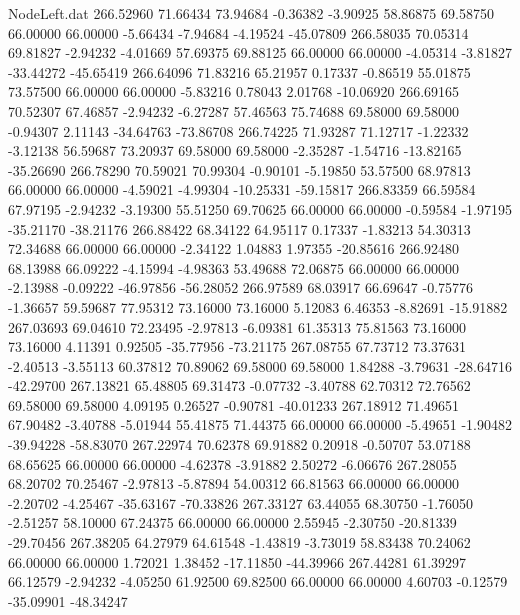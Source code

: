 \begin{filecontents}{NodeLeft.dat}
 266.52960   71.66434   73.94684    -0.36382   -3.90925   58.86875   69.58750   66.00000   66.00000   -5.66434   -7.94684   -4.19524  -45.07809
 266.58035   70.05314   69.81827    -2.94232   -4.01669   57.69375   69.88125   66.00000   66.00000   -4.05314   -3.81827  -33.44272  -45.65419
 266.64096   71.83216   65.21957     0.17337   -0.86519   55.01875   73.57500   66.00000   66.00000   -5.83216    0.78043    2.01768  -10.06920
 266.69165   70.52307   67.46857    -2.94232   -6.27287   57.46563   75.74688   69.58000   69.58000   -0.94307    2.11143  -34.64763  -73.86708
 266.74225   71.93287   71.12717    -1.22332   -3.12138   56.59687   73.20937   69.58000   69.58000   -2.35287   -1.54716  -13.82165  -35.26690
 266.78290   70.59021   70.99304    -0.90101   -5.19850   53.57500   68.97813   66.00000   66.00000   -4.59021   -4.99304  -10.25331  -59.15817
 266.83359   66.59584   67.97195    -2.94232   -3.19300   55.51250   69.70625   66.00000   66.00000   -0.59584   -1.97195  -35.21170  -38.21176
 266.88422   68.34122   64.95117     0.17337   -1.83213   54.30313   72.34688   66.00000   66.00000   -2.34122    1.04883    1.97355  -20.85616
 266.92480   68.13988   66.09222    -4.15994   -4.98363   53.49688   72.06875   66.00000   66.00000   -2.13988   -0.09222  -46.97856  -56.28052
 266.97589   68.03917   66.69647    -0.75776   -1.36657   59.59687   77.95312   73.16000   73.16000    5.12083    6.46353   -8.82691  -15.91882
 267.03693   69.04610   72.23495    -2.97813   -6.09381   61.35313   75.81563   73.16000   73.16000    4.11391    0.92505  -35.77956  -73.21175
 267.08755   67.73712   73.37631    -2.40513   -3.55113   60.37812   70.89062   69.58000   69.58000    1.84288   -3.79631  -28.64716  -42.29700
 267.13821   65.48805   69.31473    -0.07732   -3.40788   62.70312   72.76562   69.58000   69.58000    4.09195    0.26527   -0.90781  -40.01233
 267.18912   71.49651   67.90482    -3.40788   -5.01944   55.41875   71.44375   66.00000   66.00000   -5.49651   -1.90482  -39.94228  -58.83070
 267.22974   70.62378   69.91882     0.20918   -0.50707   53.07188   68.65625   66.00000   66.00000   -4.62378   -3.91882    2.50272   -6.06676
 267.28055   68.20702   70.25467    -2.97813   -5.87894   54.00312   66.81563   66.00000   66.00000   -2.20702   -4.25467  -35.63167  -70.33826
 267.33127   63.44055   68.30750    -1.76050   -2.51257   58.10000   67.24375   66.00000   66.00000    2.55945   -2.30750  -20.81339  -29.70456
 267.38205   64.27979   64.61548    -1.43819   -3.73019   58.83438   70.24062   66.00000   66.00000    1.72021    1.38452  -17.11850  -44.39966
 267.44281   61.39297   66.12579    -2.94232   -4.05250   61.92500   69.82500   66.00000   66.00000    4.60703   -0.12579  -35.09901  -48.34247

\end{filecontents}
